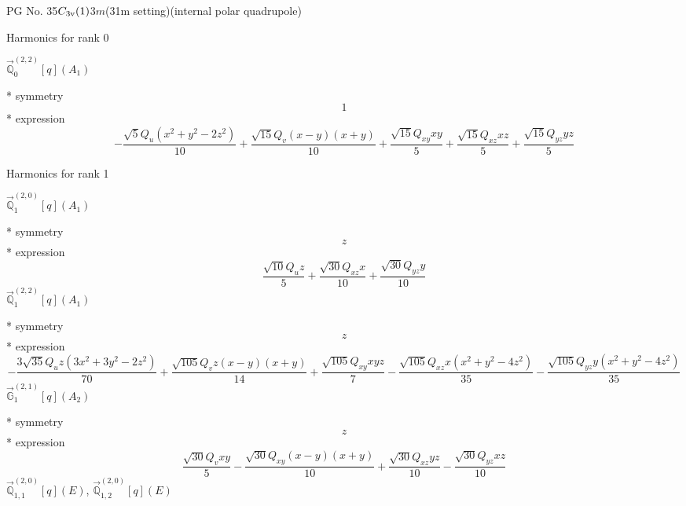 \documentclass[fleqn,8pt]{jsarticle}
\begin{document}
\setcounter{MaxMatrixCols}{32}

\renewcommand{\tablename}{Table~}
\renewcommand{\figurename}{Figure~}
\begin{center}
\LARGE
PG No. 35\quad$C_{\rm 3v}(1)$\quad$3m$\quad(31m setting)\quad[ trigonal ] (internal polar quadrupole)
\end{center}

\noindent * Harmonics for rank 0

\noindent\quad $\vec{\mathbb{Q}}_{0}^{(2,2)}[q](A_{1})$

\noindent\quad ** symmetry
\begin{dmath*}
1
\end{dmath*}
\noindent\quad ** expression
\begin{dmath*}
- \frac{\sqrt{5} Q_{u} \left(x^{2} + y^{2} - 2 z^{2}\right)}{10} + \frac{\sqrt{15} Q_{v} \left(x - y\right) \left(x + y\right)}{10} + \frac{\sqrt{15} Q_{xy} x y}{5} + \frac{\sqrt{15} Q_{xz} x z}{5} + \frac{\sqrt{15} Q_{yz} y z}{5}
\end{dmath*}

\noindent * Harmonics for rank 1

\noindent\quad $\vec{\mathbb{Q}}_{1}^{(2,0)}[q](A_{1})$

\noindent\quad ** symmetry
\begin{dmath*}
z
\end{dmath*}
\noindent\quad ** expression
\begin{dmath*}
\frac{\sqrt{10} Q_{u} z}{5} + \frac{\sqrt{30} Q_{xz} x}{10} + \frac{\sqrt{30} Q_{yz} y}{10}
\end{dmath*}
\noindent\quad $\vec{\mathbb{Q}}_{1}^{(2,2)}[q](A_{1})$

\noindent\quad ** symmetry
\begin{dmath*}
z
\end{dmath*}
\noindent\quad ** expression
\begin{dmath*}
- \frac{3 \sqrt{35} Q_{u} z \left(3 x^{2} + 3 y^{2} - 2 z^{2}\right)}{70} + \frac{\sqrt{105} Q_{v} z \left(x - y\right) \left(x + y\right)}{14} + \frac{\sqrt{105} Q_{xy} x y z}{7} - \frac{\sqrt{105} Q_{xz} x \left(x^{2} + y^{2} - 4 z^{2}\right)}{35} - \frac{\sqrt{105} Q_{yz} y \left(x^{2} + y^{2} - 4 z^{2}\right)}{35}
\end{dmath*}
\noindent\quad $\vec{\mathbb{G}}_{1}^{(2,1)}[q](A_{2})$

\noindent\quad ** symmetry
\begin{dmath*}
z
\end{dmath*}
\noindent\quad ** expression
\begin{dmath*}
\frac{\sqrt{30} Q_{v} x y}{5} - \frac{\sqrt{30} Q_{xy} \left(x - y\right) \left(x + y\right)}{10} + \frac{\sqrt{30} Q_{xz} y z}{10} - \frac{\sqrt{30} Q_{yz} x z}{10}
\end{dmath*}
\noindent\quad $\vec{\mathbb{Q}}_{1,1}^{(2,0)}[q](E)$, $\vec{\mathbb{Q}}_{1,2}^{(2,0)}[q](E)$
\end{document}
